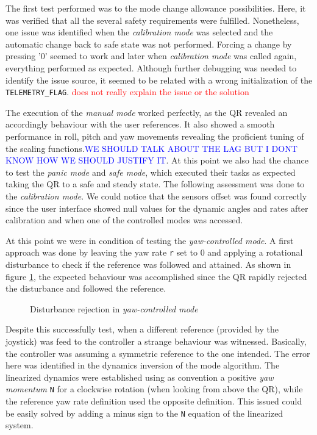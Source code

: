 \documentclass{article}
\newcommand\worries[1]{\textcolor{red}{#1}} %
\newcommand\todo[1]{\textcolor{blue}{#1}} %
\begin{document}
The first test performed was to the mode change allowance possibilities. Here, it was verified that all the several safety requirements were fulfilled. Nonetheless, one issue was identified when the \textit{calibration mode} was selected and the automatic change back to safe state was not performed. Forcing a change by pressing '$0$' seemed to work and later when \textit{calibration mode} was called again, everything performed as expected. Although further debugging was needed to identify the issue source, it seemed to be related with a wrong initialization of the \texttt{TELEMETRY\_FLAG}. \worries{does not really explain the issue or the solution}

The execution of the \textit{manual mode} worked perfectly, as the QR revealed an accordingly behaviour with the user references. It also showed a smooth performance in roll, pitch and yaw movements revealing the proficient tuning of the scaling functions.\todo{WE SHOULD TALK ABOUT THE LAG BUT I DONT KNOW HOW WE SHOULD JUSTIFY IT}. At this point we also had the chance to test the \textit{panic mode} and \textit{safe mode}, which executed their tasks as expected taking the QR to a safe and steady state. The following assessment was done to the \textit{calibration mode}. We could notice that the sensors offset was found correctly since the user interface showed null values for the dynamic angles and rates after calibration and when one of the controlled modes was accessed.

At this point we were in condition of testing the \textit{yaw-controlled mode}. A first approach was done by leaving the yaw rate \texttt{r} set to 0 and applying a rotational disturbance to check if the reference was followed and attained. As shown in figure \ref{fig:YawControl}, the expected behaviour was accomplished since the QR rapidly rejected the disturbance and followed the reference.

\begin{figure}[ht]
\centering
	\caption{Disturbance rejection in \textit{yaw-controlled mode}}
	\label{fig:YawControl}
\end{figure}

Despite this successfully test, when a different reference (provided by the joystick) was feed to the controller a strange behaviour was witnessed. Basically, the controller was assuming a symmetric reference to the one intended. The error here was identified in the dynamics inversion of the mode algorithm. The linearized dynamics were established using as convention a positive \textit{yaw momentum} \texttt{N} for a clockwise rotation (when looking from above the QR), while the reference yaw rate definition used the opposite definition. This issued could be easily solved by adding a minus sign to the \texttt{N} equation of the linearized system.
\end{document}

